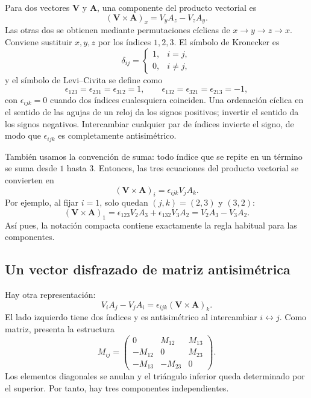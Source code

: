 Para dos vectores \(\mathbf V\) y \(\mathbf A\), una componente del producto vectorial es
\begin{equation}
  (\mathbf V\times\mathbf A)_x
  =
  V_yA_z-V_zA_y.
\end{equation}
Las otras dos se obtienen mediante permutaciones cíclicas de \(x\to y\to z\to x\). Conviene sustituir \(x,y,z\) por los índices \(1,2,3\). El símbolo de Kronecker es
\begin{equation}
  \delta_{ij}
  =
  \begin{cases}
    1,&i=j,\\
    0,&i\ne j,
  \end{cases}
\end{equation}
y el símbolo de Levi--Civita se define como
\begin{equation}
  \epsilon_{123}=\epsilon_{231}=\epsilon_{312}=1,
  \qquad
  \epsilon_{132}=\epsilon_{321}=\epsilon_{213}=-1,
\end{equation}
con \(\epsilon_{ijk}=0\) cuando dos índices cualesquiera coinciden. Una ordenación cíclica en el sentido de las agujas de un reloj da los signos positivos; invertir el sentido da los signos negativos. Intercambiar cualquier par de índices invierte el signo, de modo que \(\epsilon_{ijk}\) es completamente antisimétrico.

También usamos la convención de suma: todo índice que se repite en un término se suma desde \(1\) hasta \(3\). Entonces, las tres ecuaciones del producto vectorial se convierten en
\begin{equation}
  (\mathbf V\times\mathbf A)_i
  =
  \epsilon_{ijk}V_jA_k.
\end{equation}
Por ejemplo, al fijar \(i=1\), solo quedan \((j,k)=(2,3)\) y \((3,2)\):
\begin{equation}
  (\mathbf V\times\mathbf A)_1
  =
  \epsilon_{123}V_2A_3
  +\epsilon_{132}V_3A_2
  =
  V_2A_3-V_3A_2.
\end{equation}
Así pues, la notación compacta contiene exactamente la regla habitual para las componentes.

\subsection{Un vector disfrazado de matriz antisimétrica}

Hay otra representación:
\begin{equation}
  V_iA_j-V_jA_i
  =
  \epsilon_{ijk}(\mathbf V\times\mathbf A)_k.
\end{equation}
El lado izquierdo tiene dos índices y es antisimétrico al intercambiar \(i\leftrightarrow j\). Como matriz, presenta la estructura
\begin{equation}
  M_{ij}
  =
  \begin{pmatrix}
    0&M_{12}&M_{13}\\
    -M_{12}&0&M_{23}\\
    -M_{13}&-M_{23}&0
  \end{pmatrix}.
\end{equation}
Los elementos diagonales se anulan y el triángulo inferior queda determinado por el superior. Por tanto, hay tres componentes independientes.

